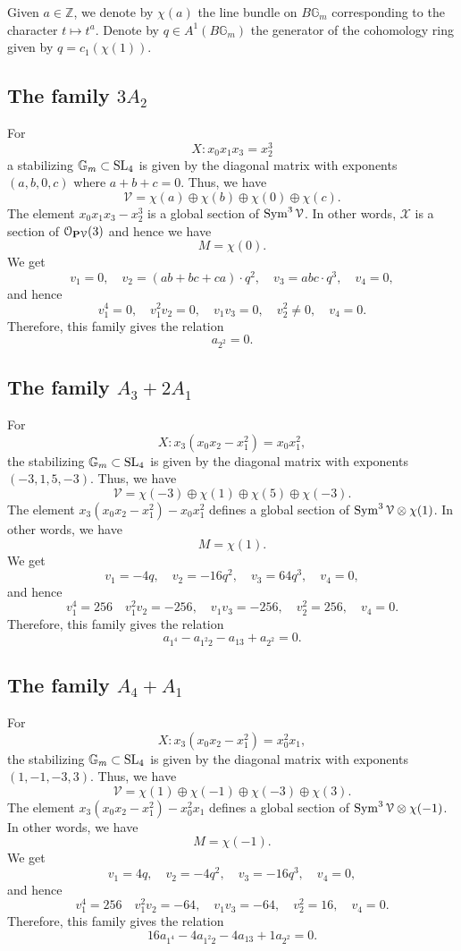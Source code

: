 \documentclass[12pt,reqno]{amsart}
\numberwithin{equation}{section}
\begin{document}
Given $a \in \mathbb Z$, we denote by $\chi(a)$ the line bundle on $B\mathbb G_m$ corresponding to the character $t \mapsto t^a$.
Denote by $q \in A^1(B\mathbb G_m)$ the generator of the cohomology ring given by $q = c_1(\chi(1))$.
\subsection{The family $3A_2$}
For
\[ X: x_0x_1x_3 = x_2^3\]
a stabilizing $\mathbb G_m \subset \SL_4$ is given by the diagonal matrix with exponents $(a,b,0,c)$ where $a+b+c = 0$.
Thus, we have
\[\mathcal V = \chi(a) \oplus \chi(b) \oplus \chi(0) \oplus \chi(c).\]
The element $x_0x_1x_3 - x_2^3$ is a global section of $\Sym^3 \mathcal V$.
In other words, $\mathcal X$ is a section of $\mathcal O_{\P \mathcal V}(3)$ and hence we have
\[ M = \chi(0).\]
We get
\[ v_1 = 0, \quad v_2 = (ab+bc+ca) \cdot q^2, \quad v_3 = abc \cdot q^3, \quad v_4 = 0,\]
and hence
\[ v_1^4 = 0, \quad v_1^2v_2 = 0, \quad v_1v_3 = 0,\quad v_2^2 \neq 0, \quad v_4 = 0.\]
Therefore, this family gives the relation
\begin{equation}\label{eqn:iso1}
  a_{2^2} = 0.
\end{equation}

\subsection{The family $A_3 + 2A_1$}
For
\[ X: x_3(x_0x_2-x_1^2) = x_0x_1^2,\]
the stabilizing $\mathbb G_m \subset \SL_4$ is given by the diagonal matrix with exponents $(-3,1,5,-3)$.
Thus, we have
\[ \mathcal V = \chi(-3) \oplus \chi(1) \oplus \chi(5) \oplus \chi(-3).\]
The element $x_3(x_0x_2-x_1^2) - x_0x_1^2$ defines a global section of $\Sym^3 \mathcal V \otimes \chi(1)$.
In other words, we have
\[ M = \chi(1).\]
We get
\[ v_1 = -4q, \quad v_2 = -16q^2, \quad v_3 = 64q^3, \quad v_4 = 0,\]
and hence
\[ v_1^4 = 256 \quad v_1^2v_2 = -256, \quad v_1v_3 = -256, \quad v_2^2 = 256, \quad v_4 = 0.\]
Therefore, this family gives the relation
\begin{equation}\label{eqn:iso2}
  a_{1^4} - a_{1^2 2}- a_{13} +  a_{2^2}  = 0.
\end{equation}

\subsection{The family $A_4 + A_1$}
For
\[ X: x_3(x_0x_2-x_1^2) = x_0^2x_1,\]
the stabilizing $\mathbb G_m \subset \SL_4$ is given by the diagonal matrix with exponents $(1,-1,-3,3)$.
Thus, we have
\[ \mathcal V = \chi(1) \oplus \chi(-1) \oplus \chi(-3) \oplus \chi(3).\]
The element $x_3(x_0x_2-x_1^2) - x^2_0x_1$ defines a global section of $\Sym^3 \mathcal V \otimes \chi(-1)$.
In other words, we have
\[ M = \chi(-1).\]
We get
\[ v_1 = 4q, \quad v_2 = -4q^2, \quad v_3 = -16q^3, \quad v_4 = 0,\]
and hence
\[ v_1^4 = 256 \quad v_1^2v_2 = -64, \quad v_1v_3 = -64, \quad v_2^2 = 16, \quad v_4 = 0.\]
Therefore, this family gives the relation
\begin{equation}\label{eqn:iso3}
  16a_{1^4} -4a_{1^2 2}- 4a_{13} + 1 a_{2^2}  = 0.
\end{equation}
\end{document}
